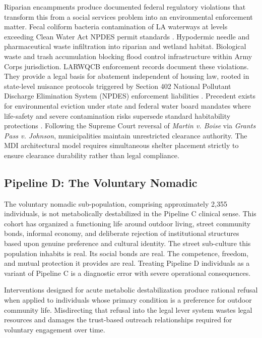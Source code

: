 \documentclass[12pt, letterpaper]{article}
\begin{document}
Riparian encampments produce documented federal regulatory violations that transform this from a social services problem into an environmental enforcement matter. Fecal coliform bacteria contamination of LA waterways at levels exceeding Clean Water Act NPDES permit standards \citep{clean_water_act_1972}. Hypodermic needle and pharmaceutical waste infiltration into riparian and wetland habitat. Biological waste and trash accumulation blocking flood control infrastructure within Army Corps jurisdiction. LARWQCB enforcement records document these violations. They provide a legal basis for abatement independent of housing law, rooted in state-level nuisance protocols triggered by Section 402 National Pollutant Discharge Elimination System (NPDES) enforcement liabilities \citep{clean_water_act_1972}. Precedent exists for environmental eviction under state and federal water board mandates where life-safety and severe contamination risks supersede standard habitability protections \citep{epa_encampment_abatement_2023}. Following the Supreme Court reversal of \textit{Martin v. Boise} via \textit{Grants Pass v. Johnson}, municipalities maintain unrestricted clearance authority. The MDI architectural model requires simultaneous shelter placement strictly to ensure clearance durability rather than legal compliance.

\subsection{Pipeline D: The Voluntary Nomadic}

The voluntary nomadic sub-population, comprising approximately 2,355 individuals, is not metabolically destabilized in the Pipeline C clinical sense. This cohort has organized a functioning life around outdoor living, street community bonds, informal economy, and deliberate rejection of institutional structures based upon genuine preference and cultural identity. The street sub-culture this population inhabits is real. Its social bonds are real. The competence, freedom, and mutual protection it provides are real. Treating Pipeline D individuals as a variant of Pipeline C is a diagnostic error with severe operational consequences.

Interventions designed for acute metabolic destabilization produce rational refusal when applied to individuals whose primary condition is a preference for outdoor community life. Misdirecting that refusal into the legal lever system wastes legal resources and damages the trust-based outreach relationships required for voluntary engagement over time.
\end{document}
